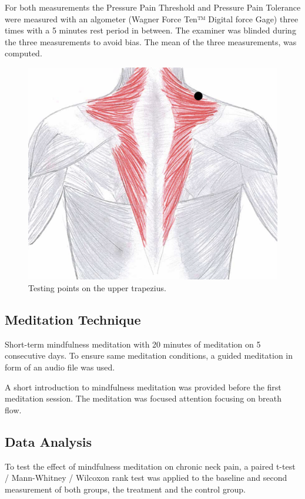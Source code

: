 For both measurements the Pressure Pain Threshold and Pressure Pain Tolerance were measured with an algometer (Wagner Force Ten™ Digital force Gage) three times with a 5 minutes rest period in between. The examiner was blinded during the three measurements to avoid bias. The mean of the three measurements, was computed. 

\begin{figure}[H]
\centering
\includegraphics[width=.7\columnwidth]{../figures/trapezius}
\caption{Testing points on the upper trapezius.}
\label{fig:trapezius}
\end{figure} \vspace{-.5cm}


\subsection{Meditation Technique}
Short-term mindfulness meditation with 20 minutes of meditation on 5 consecutive days. To ensure same meditation conditions, a guided meditation in form of an audio file was used. 

A short introduction to mindfulness meditation was provided before the first meditation session. The meditation was focused attention focusing on breath flow.

\subsection{Data Analysis}
To test the effect of mindfulness meditation on chronic neck pain, a paired t-test / Mann-Whitney / Wilcoxon rank test was applied to the baseline and second measurement of both groups, the treatment and the control group.
